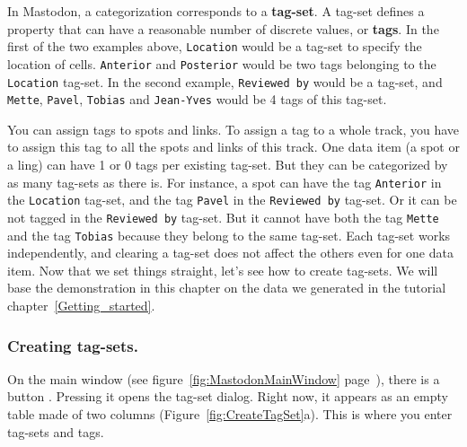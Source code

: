 In Mastodon, a categorization corresponds to a \textbf{tag-set}.
A tag-set defines a property that can have a reasonable number of discrete values, or \textbf{tags}.
In the first of the two examples above, \texttt{Location} would be a tag-set to specify the location of cells.
\texttt{Anterior} and \texttt{Posterior} would be two tags belonging to the \texttt{Location} tag-set.
In the second example, \texttt{Reviewed by} would be a tag-set, and \texttt{Mette}, \texttt{Pavel}, \texttt{Tobias} and \texttt{Jean-Yves} would be 4 tags of this tag-set.

You can assign tags to spots and links.
To assign a tag to a whole track, you have to assign this tag to all the spots and links of this track.
One data item (a spot or a ling) can have 1 or 0 tags per existing tag-set.
But they can be categorized by as many tag-sets as there is.
For instance, a spot can have the tag \texttt{Anterior} in the \texttt{Location} tag-set, and the tag \texttt{Pavel} in the \texttt{Reviewed by} tag-set. 
Or it can be not tagged in the \texttt{Reviewed by} tag-set.
But it cannot have both the tag \texttt{Mette} and the tag \texttt{Tobias} because they belong to the same tag-set.
Each tag-set works independently, and clearing a tag-set does not affect the others even for one data item.
Now that we set things straight, let's see how to create tag-sets.
We will base the demonstration in this chapter on the data we generated in the tutorial chapter~\ref{Getting_started}.


\subsubsection{Creating tag-sets.}

On the main window (see figure~\ref{fig:MastodonMainWindow} page~\pageref{fig:MastodonMainWindow}), there is a button . 
Pressing it opens the tag-set dialog. 
Right now, it appears as an empty table made of two columns (Figure~\ref{fig:CreateTagSet}a). 
This is where you enter tag-sets and tags.

